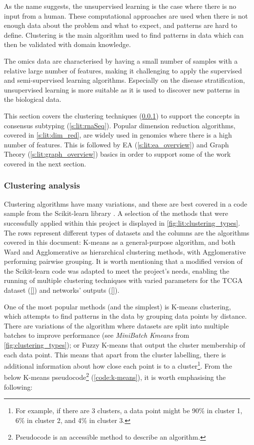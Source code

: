 As the name suggests, the unsupervised learning is the case where there is no input from a human. These computational approaches are used when there is not enough data about the problem and what to expect, and patterns are hard to define. Clustering is the main algorithm used to find patterns in data which can then be validated with domain knowledge. 

The omics data are characterised by having a small number of samples with a relative large number of features, making it challenging to apply the supervised and semi-supervised learning algorithms. Especially on the disease stratification, unsupervised learning is more suitable as it is used to discover new patterns in the biological data.

This section covers the clustering techniques (\ref{s:lit:clustering}) to support the concepts in consensus subtyping (\ref{s:lit:rnaSeq}). Popular dimension reduction algorithms, covered in \cref{s:lit:dim_red}, are widely used in genomics where there is a high number of features. This is followed by EA (\ref{s:lit:ea_overview}) and Graph Theory (\ref{s:lit:graph_overview}) basics in order to support some of the work covered in the next section.

\subsubsection{Clustering analysis} \label{s:lit:clustering}

Clustering algorithms have many variations, and these are best covered in a code sample \cite{Scikit-learn_undated-ax} from the Scikit-learn library \cite{Pedregosa2011-ts}. A selection of the methods that were successfully applied within this project is displayed in \cref{fig:lit:clustering_types}. The rows represent different types of datasets and the columns are the algorithms covered in this document: K-means as a general-purpose algorithm, and both Ward and Agglomerative as hierarchical clustering methods, with Agglomerative performing pairwise grouping. It is worth mentioning that a modified version of the Scikit-learn code was adapted to meet the project's needs, enabling the running of multiple clustering techniques with varied parameters for the TCGA dataset (\ref{}) and networks' outputs (\ref{}).

One of the most popular methods (and the simplest) is K-means clustering, which attempts to find patterns in the data by grouping data points by distance. There are variations of the algorithm where datasets are split into multiple batches to improve performance (see \textit{MiniBatch Kmeans} from \cref{fig:clustering_types}); or Fuzzy K-means that output the cluster membership of each data point. This means that apart from the cluster labelling, there is additional information about how close each point is to a cluster\footnote{For example, if there are 3 clusters, a data point might be 90\% in cluster 1, 6\% in cluster 2, and 4\% in cluster 3.}. From the below K-means pseudocode\footnote{Pseudocode is an accessible method to describe an algorithm.} (\cref{code:k-means}), it is worth emphasising the following:


